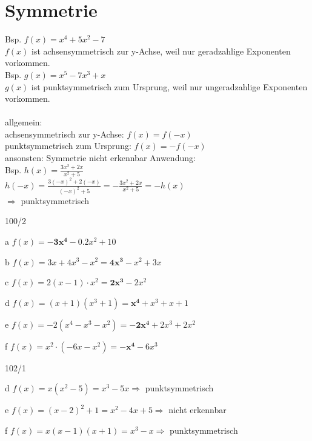 \section{Symmetrie}
Bsp. $f(x) = x^4 + 5x^2 - 7$ \\
$f(x)$ ist achsensymmetrisch zur y-Achse, weil nur geradzahlige Exponenten vorkommen. \\
Bsp. $g(x) = x^5 - 7x^3 + x$ \\
$g(x)$ ist punktsymmetrisch zum Ursprung, weil nur ungeradzahlige Exponenten vorkommen. \\\\
allgemein: \\
achsensymmetrisch zur y-Achse: $f(x) = f(-x)$ \\
punktsymmetrisch zum Ursprung: $f(x) = -f(-x)$ \\
ansonsten: Symmetrie nicht erkennbar
\newpage
Anwendung: \\
Bsp. $h(x) = \frac{3x^2 + 2x}{x^2 + 5}$ \\
$h(-x) = \frac{3(-x)^2 + 2(-x)}{(-x)^2 + 5} = -\frac{3x^2 + 2x}{x^2 + 5} = -h(x)$ \\
$\Rightarrow$ punktsymmetrisch
\begin{exercise}{100/2}
  \item [a] $f(x) = \boldsymbol{-3x^4} - 0.2x^2 + 10$
  \item [b] $f(x) = 3x + 4x^3 - x^2 = \boldsymbol{4x^3} - x^2 + 3x$
  \item [c] $f(x) = 2(x - 1) \cdot x^2 = \boldsymbol{2x^3} - 2x^2$
  \item [d] $f(x) = (x + 1)(x^3 + 1) = \boldsymbol{x^4} + x^3 + x + 1$
  \item [e] $f(x) = -2(x^4 - x^3 - x^2) = \boldsymbol{-2x^4} + 2x^3 + 2x^2$
  \item [f] $f(x) = x^2 \cdot (-6x - x^2) = \boldsymbol{-x^4} - 6x^3$
\end{exercise}
\begin{exercise}{102/1}
  \item [d] $f(x) = x(x^2 - 5) = x^3 - 5x \Rightarrow $ punktsymmetrisch
  \item [e] $f(x) = (x - 2)^2 + 1 = x^2 - 4x + 5 \Rightarrow $ nicht erkennbar
  \item [f] $f(x) = x(x - 1)(x + 1) = x^3 - x \Rightarrow $ punktsymmetrisch
\end{exercise}
\newpage
